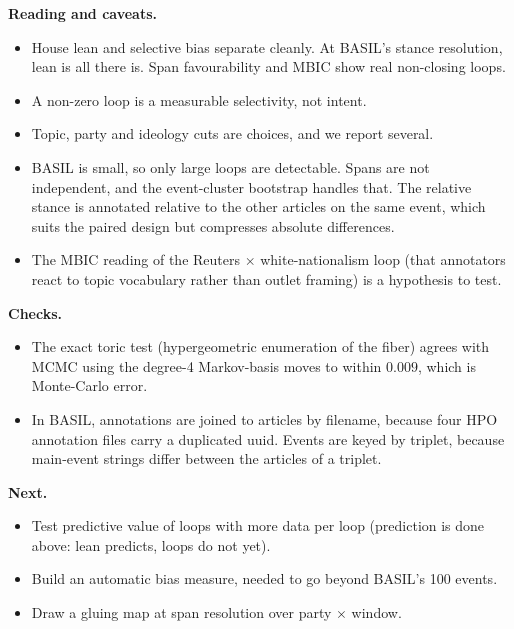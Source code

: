 \documentclass[11pt]{article}
\theoremstyle{definition}
\theoremstyle{remark}
\begin{document}
\textbf{Reading and caveats.}
\begin{itemize}
  \item House lean and selective bias separate cleanly. At BASIL's stance resolution, lean is all there is. Span favourability and MBIC show real non-closing loops.
  \item A non-zero loop is a measurable selectivity, not intent.
  \item Topic, party and ideology cuts are choices, and we report several.
  \item BASIL is small, so only large loops are detectable. Spans are not independent, and the event-cluster bootstrap handles that. The relative stance is annotated relative to the other articles on the same event, which suits the paired design but compresses absolute differences.
  \item The MBIC reading of the Reuters $\times$ white-nationalism loop (that annotators react to topic vocabulary rather than outlet framing) is a hypothesis to test.
\end{itemize}
\textbf{Checks.}
\begin{itemize}
  \item The exact toric test (hypergeometric enumeration of the fiber) agrees with MCMC using the degree-4 Markov-basis moves to within $0.009$, which is Monte-Carlo error.
  \item In BASIL, annotations are joined to articles by filename, because four HPO annotation files carry a duplicated uuid. Events are keyed by triplet, because main-event strings differ between the articles of a triplet.
\end{itemize}
\textbf{Next.}
\begin{itemize}
  \item Test predictive value of loops with more data per loop (prediction is done above: lean predicts, loops do not yet).
  \item Build an automatic bias measure, needed to go beyond BASIL's 100 events.
  \item Draw a gluing map at span resolution over party $\times$ window.
\end{itemize}
\end{document}
